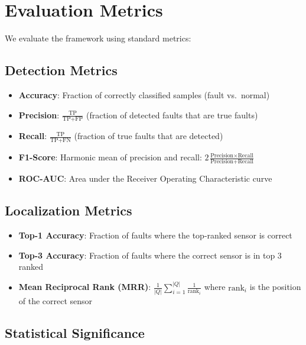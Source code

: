 \section{Evaluation Metrics}

We evaluate the framework using standard metrics:

\subsection{Detection Metrics}

\begin{itemize}
    \item \textbf{Accuracy}: Fraction of correctly classified samples (fault vs.\ normal)
    \item \textbf{Precision}: $\frac{\text{TP}}{\text{TP} + \text{FP}}$ (fraction of detected faults that are true faults)
    \item \textbf{Recall}: $\frac{\text{TP}}{\text{TP} + \text{FN}}$ (fraction of true faults that are detected)
    \item \textbf{F1-Score}: Harmonic mean of precision and recall: $2 \frac{\text{Precision} \times \text{Recall}}{\text{Precision} + \text{Recall}}$
    \item \textbf{ROC-AUC}: Area under the Receiver Operating Characteristic curve \parencite{fawcett2006introduction}
\end{itemize}

\subsection{Localization Metrics}

\begin{itemize}
    \item \textbf{Top-1 Accuracy}: Fraction of faults where the top-ranked sensor is correct
    \item \textbf{Top-3 Accuracy}: Fraction of faults where the correct sensor is in top 3 ranked
    \item \textbf{Mean Reciprocal Rank (MRR)}: $\frac{1}{|Q|} \sum_{i=1}^{|Q|} \frac{1}{\text{rank}_i}$ where $\text{rank}_i$ is the position of the correct sensor
\end{itemize}

\subsection{Statistical Significance}

